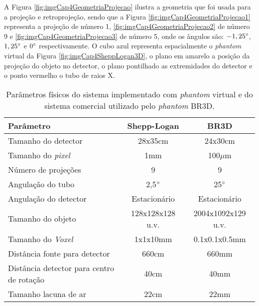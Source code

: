 A Figura \ref{fig:imgCap4GeometriaProjecao} ilustra a geometria que foi usada para a projeção e retroprojeção, sendo que a Figura \ref{fig:imgCap4GeometriaProjecao1} representa a projeção de número 1, \ref{fig:imgCap4GeometriaProjecao2} de número 9 e \ref{fig:imgCap4GeometriaProjecao3} de número 5, onde os ângulos são: $-1,25\degree$, $1,25\degree$ e $0\degree$ respectivamente. O cubo azul representa espacialmente o \textit{phantom} virtual da Figura \ref{fig:imgCap4SheppLogan3D}, o plano em amarelo a posição da projeção do objeto no detector, o plano pontilhado as extremidades do detector e o ponto vermelho o tubo de raios X. 


\begin{table}[H]
	\footnotesize
	\centering
	\caption{Parâmetros físicos do sistema implementado com \textit{phantom} virtual e do sistema comercial utilizado pelo \textit{phantom} BR3D.}
	\label{tab:tabCap4ParametrosPhantoms}
	\begin{tabular}{l|c|c}
		\textbf{Parâmetro}                            &  \textbf{Shepp-Logan} &  \textbf{BR3D}  \\
		[5pt]
		\hline
		\hline
		\rule[-0.5ex]{0pt}{3ex}
		Tamanho do detector 						  &     28x35cm       &      24x30cm       \\ \hline
		\rule[-0.5ex]{0pt}{3ex}
		Tamanho do \textit{pixel}                     &       1mm        &     100$\mu$m      \\ \hline
		\rule[-0.5ex]{0pt}{3ex}
		Número de projeções                           &        9         &         9          \\ \hline
		\rule[-0.5ex]{0pt}{3ex}
		Angulação do tubo                             &   2,5$\degree$   &    25$\degree$     \\ \hline
		\rule[-0.5ex]{0pt}{3ex}
		Angulação do detector                         &   Estacionário   &    Estacionário    \\ \hline
		\rule[-0.5ex]{0pt}{3ex}
		Tamanho do objeto                             & 128x128x128 u.v. & 2004x1092x129 u.v. \\ \hline
		\rule[-0.5ex]{0pt}{3ex}
		Tamanho do \textit{Voxel}                     &     1x1x10mm     &   0.1x0.1x0.5mm    \\ \hline
		\rule[-0.5ex]{0pt}{3ex}
		Distância fonte para detector                 &      660cm       &       660mm        \\ \hline
		\rule[-0.5ex]{0pt}{3ex}
		Distância detector para centro de rotação     &       40cm       &        40mm        \\ \hline
		\rule[-0.5ex]{0pt}{3ex}
		Tamanho lacuna de ar                          &       22cm       &        22mm        \\ \hline
	\end{tabular}
	\vspace{2ex}
\end{table}


